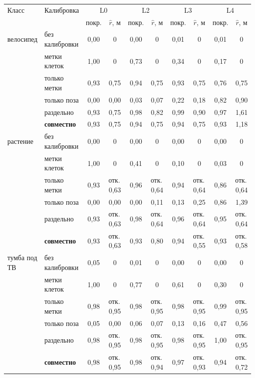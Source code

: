 \begin{tabular}{llcccccccc}
\toprule
Класс & Калибровка & \multicolumn{2}{c}{L0} & \multicolumn{2}{c}{L2} & \multicolumn{2}{c}{L3} & \multicolumn{2}{c}{L4} \\
 & & покр. & $\hat r$, м & покр. & $\hat r$, м & покр. & $\hat r$, м & покр. & $\hat r$, м \\
\midrule
велосипед & без калибровки & 0{,}00 & 0 & 0{,}00 & 0 & 0{,}01 & 0 & 0{,}01 & 0 \\
 & метки клеток & 1{,}00 & 0 & 0{,}73 & 0 & 0{,}34 & 0 & 0{,}17 & 0 \\
 & только метки & 0{,}93 & 0{,}75 & 0{,}94 & 0{,}75 & 0{,}93 & 0{,}75 & 0{,}76 & 0{,}75 \\
 & только поза & 0{,}00 & 0{,}00 & 0{,}03 & 0{,}07 & 0{,}22 & 0{,}18 & 0{,}82 & 0{,}90 \\
 & раздельно & 0{,}93 & 0{,}75 & 0{,}98 & 0{,}82 & 0{,}99 & 0{,}90 & 0{,}97 & 1{,}61 \\
 & \textbf{совместно} & 0{,}93 & 0{,}75 & 0{,}94 & 0{,}75 & 0{,}94 & 0{,}75 & 0{,}93 & 1{,}18 \\
\midrule
растение & без калибровки & 0{,}00 & 0 & 0{,}00 & 0 & 0{,}00 & 0 & 0{,}00 & 0 \\
 & метки клеток & 1{,}00 & 0 & 0{,}41 & 0 & 0{,}10 & 0 & 0{,}03 & 0 \\
 & только метки & 0{,}93 & отк.\,0{,}63 & 0{,}96 & отк.\,0{,}64 & 0{,}94 & отк.\,0{,}64 & 0{,}86 & отк.\,0{,}64 \\
 & только поза & 0{,}00 & 0{,}00 & 0{,}00 & 0{,}11 & 0{,}13 & 0{,}25 & 0{,}86 & 1{,}39 \\
 & раздельно & 0{,}93 & отк.\,0{,}63 & 0{,}98 & отк.\,0{,}64 & 0{,}96 & отк.\,0{,}64 & 0{,}95 & отк.\,0{,}64 \\
 & \textbf{совместно} & 0{,}93 & отк.\,0{,}63 & 0{,}93 & 0{,}80 & 0{,}94 & отк.\,0{,}55 & 0{,}93 & отк.\,0{,}58 \\
\midrule
тумба под ТВ & без калибровки & 0{,}05 & 0 & 0{,}01 & 0 & 0{,}00 & 0 & 0{,}00 & 0 \\
 & метки клеток & 1{,}00 & 0 & 0{,}77 & 0 & 0{,}61 & 0 & 0{,}30 & 0 \\
 & только метки & 0{,}98 & отк.\,0{,}95 & 0{,}98 & отк.\,0{,}95 & 0{,}98 & отк.\,0{,}95 & 0{,}99 & отк.\,0{,}95 \\
 & только поза & 0{,}05 & 0{,}00 & 0{,}06 & 0{,}07 & 0{,}13 & 0{,}16 & 0{,}47 & 0{,}56 \\
 & раздельно & 0{,}98 & отк.\,0{,}95 & 0{,}98 & отк.\,0{,}95 & 0{,}98 & отк.\,0{,}95 & 1{,}00 & отк.\,0{,}95 \\
 & \textbf{совместно} & 0{,}98 & отк.\,0{,}95 & 0{,}98 & отк.\,0{,}94 & 0{,}97 & отк.\,0{,}93 & 0{,}94 & отк.\,0{,}72 \\
\bottomrule
\end{tabular}
